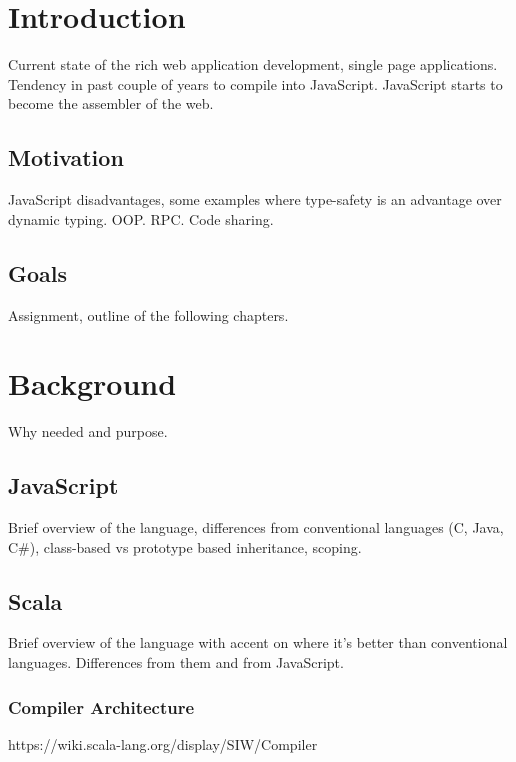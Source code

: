 \documentclass[12pt,a4paper]{report}
\begin{document}
\chapter{Introduction}

Current state of the rich web application development, single page applications. Tendency in past couple of years to compile into JavaScript. JavaScript starts to become the assembler of the web.

\section{Motivation}

JavaScript disadvantages, some examples where type-safety is an advantage over dynamic typing. OOP. RPC. Code sharing.

\section{Goals}

Assignment, outline of the following chapters.


\chapter{Background}

Why needed and purpose. 

\section{JavaScript}

Brief overview of the language, differences from conventional languages (C, Java, C\#), class-based vs prototype based inheritance, scoping.

\section{Scala}

Brief overview of the language with accent on where it's better than conventional languages. Differences from them and from JavaScript.

\subsection{Compiler Architecture}

https://wiki.scala-lang.org/display/SIW/Compiler
\end{document}
